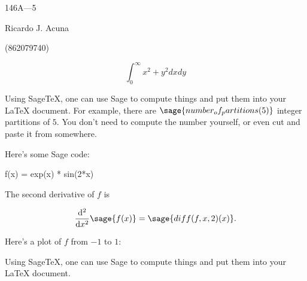 \documentclass{article}
\begin{document}
\begin{center}
  146A---5

  Ricardo J. Acuna

  (862079740)
\end{center}\vspace{1.618em}

\[\int_0^\infty x^2 +y^2 dxdy\]

Using Sage\TeX, one can use Sage to compute things and put them into
your \LaTeX{} document. For example, there are
$\sage{number_of_partitions(5)}$ integer partitions of $5$.
You don't need to compute the number yourself, or even cut and paste
it from somewhere.

Here's some Sage code:

\begin{sageblock}
    f(x) = exp(x) * sin(2*x)
\end{sageblock}

The second derivative of $f$ is

\[
  \frac{\mathrm{d}^{2}}{\mathrm{d}x^{2}} \sage{f(x)} =
  \sage{diff(f, x, 2)(x)}.
\]

Here's a plot of $f$ from $-1$ to $1$:

Using Sage\TeX, one can use Sage to compute things and put them into
your \LaTeX{} document.
\end{document}
